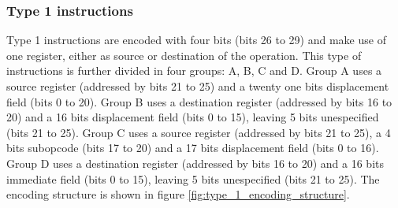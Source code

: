 \subsubsection{Type 1 instructions}
\label{sssec:type_1}
Type 1 instructions are encoded with four bits (bits 26 to 29) and make use of one register, either as source or destination of the operation. This type
of instructions is further divided in four groups: A, B, C and D. Group A uses a source register (addressed by bits 21 to 25) and a twenty one bits
displacement field (bits 0 to 20). Group B uses a destination register (addressed by bits 16 to 20) and a 16 bits displacement field (bits 0 to 15),
leaving 5 bits unespecified (bits 21 to 25). Group C uses a source register (addressed by bits 21 to 25), a 4 bits subopcode (bits 17 to 20) and a 17 bits
displacement field (bits 0 to 16). Group D uses a destination register (addressed by bits 16 to 20) and a 16 bits immediate field (bits 0 to 15), leaving 5
bits unespecified (bits 21 to 25). The encoding structure is shown in figure \ref{fig:type_1_encoding_structure}.

